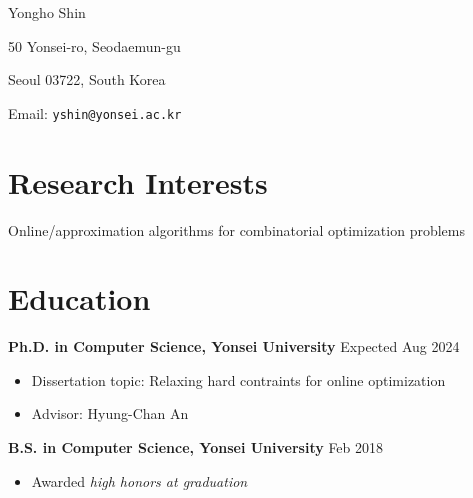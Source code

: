 \documentclass{cv}
\begin{document}
\centerline{\Huge{Yongho Shin}}
\vspace{1em}
\centerline{50 Yonsei-ro, Seodaemun-gu}
\centerline{Seoul 03722, South Korea}
\centerline{Email: \texttt{yshin@yonsei.ac.kr}}

\section{Research Interests}
Online/approximation algorithms for combinatorial optimization problems

\section{Education}
\textbf{Ph.D. in Computer Science, Yonsei University} \hfill Expected Aug 2024
\vspace{\killinitspace}
\begin{itemize}
\item Dissertation topic: Relaxing hard contraints for online optimization
\item Advisor: Hyung-Chan An
\end{itemize}

\textbf{B.S. in Computer Science, Yonsei University} \hfill Feb 2018
\vspace{\killinitspace}
\begin{itemize}
\item Awarded \textsl{high honors at graduation}
\end{itemize}

\end{document}
